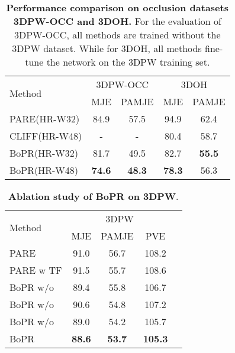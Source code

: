 \documentclass[10pt,twocolumn,letterpaper]{article}
\begin{document}
\begin{table}
\centering
{}
\caption{\textbf{Axis-wise performance comparison on the 3DPW-Test.} All methods have been trained on dataset with 3DPW.}
\label{tab:occ}
\end{table}


\begin{table}
\centering
\begin{tabular}{lcccc}
\toprule[1.5pt]
\multirow{2}{*}{Method} & \multicolumn{2}{c}{3DPW-OCC} & \multicolumn{2}{c}{3DOH} \\ 
 & MJE & PAMJE & MJE & PAMJE \\ \hline
PARE(HR-W32) &84.9 &57.5 &94.9 &62.4  \\ 
CLIFF(HR-W48) &- &- &80.4 &58.7 \\\hline
BoPR(HR-W32) &81.7 &49.5 &82.7 &\textbf{55.5} \\
BoPR(HR-W48) &\textbf{74.6} &\textbf{48.3} &\textbf{78.3} &56.3 \\\bottomrule[1.5pt]
\end{tabular}

\caption{\textbf{Performance comparison on occlusion datasets 3DPW-OCC and 3DOH.} For the evaluation of 3DPW-OCC, all methods are trained without the 3DPW dataset. While for 3DOH, all methods fine-tune the network on the 3DPW training set.}
\label{table1}
\end{table}

\begin{table}
\centering
\begin{tabular}{lcccc}
\toprule[1.5pt]
\multirow{2}{*}{Method} & \multicolumn{3}{c}{3DPW}  \\ 
 & MJE & PAMJE & PVE  \\ \hline
PARE &91.0 &56.7 &108.2 \\ 
PARE w TF &91.5 &55.7 &108.6\\ \hline
BoPR w/o  &89.4 &55.8 &106.7\\
BoPR w/o  &90.6 &54.8 &107.2\\
BoPR w/o  &89.0 &54.2 &105.7\\
BoPR &\textbf{88.6} &\textbf{53.7} &\textbf{105.3}\\
\bottomrule[1.5pt]
\end{tabular}

\caption{\textbf{Ablation study of BoPR on 3DPW}.}
\label{tab:abl}
\end{table}
\end{document}
